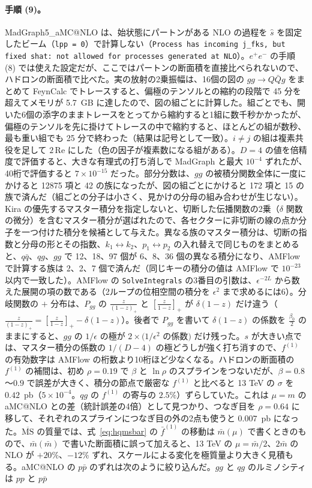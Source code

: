 \documentclass[a4paper,10pt]{ltjsarticle}
\newcommand{\MSbar}{\overline{\mathrm{MS}}}
\begin{document}
\paragraph{手順 (9)。}MadGraph5\_aMC@NLO は、始状態にパートンがある NLO の過程を $\hat s$ を固定したビーム（\texttt{lpp = 0}）で計算しない（\texttt{Process has incoming j\_fks, but fixed shat: not allowed for processes generated at NLO}）。$e^+e^-$ の手順 (8) では使えた設定だが、ここではパートンの断面積を直接比べられないので、ハドロンの断面積で比べた。実の放射の2乗振幅は、16個の図の $gg\to Q\bar Qg$ をまとめて FeynCalc でトレースすると、偏極のテンソルとの縮約の段階で 45 分を超えてメモリが 5.7~GB に達したので、図の組ごとに計算した。組ごとでも、開いた6個の添字のままトレースをとってから縮約すると1組に数千秒かかったが、偏極のテンソルを先に掛けてトレースの中で縮約すると、ほとんどの組が数秒、最も重い組でも 25 分で終わった（結果は記号として一致）。$i\ne j$ の組は複素共役を足して $2\,\mathrm{Re}$ にした（色の因子が複素数になる組がある）。$D=4$ の値を倍精度で評価すると、大きな有理式の打ち消しで MadGraph と最大 $10^{-4}$ ずれたが、40桁で評価すると $7\times10^{-15}$ だった。部分分数は、$gg$ の被積分関数全体に一度にかけると 12875 項と 42 の族になったが、図の組ごとにかけると 172 項と 15 の族で済んだ（組ごとの分子は小さく、見かけの分母の組み合わせが生じない）。Kira の優先するマスター積分を指定しないと、切断した伝播関数の2乗（$\delta$ 関数の微分）を含むマスター積分が選ばれたので、各セクターに非切断の線の点か分子を一つ付けた積分を候補として与えた。異なる族のマスター積分は、切断の指数と分母の形とその指数、$k_1\leftrightarrow k_2$、$p_1\leftrightarrow p_2$ の入れ替えで同じものをまとめると、$q\bar q$、$qg$、$gg$ で 12、18、97 個が 6、8、36 個の異なる積分になり、AMFlow で計算する族は 2、2、7 個で済んだ（同じキーの積分の値は AMFlow で $10^{-23}$ 以内で一致した）。AMFlow の \texttt{SolveIntegrals} の3番目の引数は、$\epsilon^{-2L}$ から数えた展開の項の数である（2ループの位相空間の積分を $\epsilon^2$ まで求めるには6）。分岐関数の $+$ 分布は、$P_{gg}$ の $\frac z{(1-z)_+}$ と $[\frac z{1-z}]_+$ が $\delta(1-z)$ だけ違う（$\frac z{(1-z)_+}=[\frac z{1-z}]_+-\delta(1-z)$）。後者で $P_{gg}$ を書いて $\delta(1-z)$ の係数を $\frac{\beta_0}2$ のままにすると、$gg$ の $1/\epsilon$ の極が $2\times(1/\epsilon^2$ の係数$)$ だけ残った。$s$ が大きい点では、マスター積分の係数の $1/(D-4)$ の極どうしが強く打ち消すので、$f^{(1)}$ の有効数字は AMFlow の桁数より10桁ほど少なくなる。ハドロンの断面積の $f^{(1)}$ の補間は、初め $\rho=0.19$ で $\beta$ と $\ln\rho$ のスプラインをつないだが、$\beta=0.8$〜$0.9$ で誤差が大きく、積分の節点で厳密な $f^{(1)}$ と比べると 13 TeV の $\sigma$ を $0.42$~pb（$5\times10^{-4}$。$qg$ の $f^{(1)}$ の寄与の $2.5\%$）ずらしていた。これは $\mu=m$ の aMC@NLO との差（統計誤差の4倍）として見つかり、つなぎ目を $\rho=0.64$ に移して、それぞれのスプラインにつなぎ目の外の2点も使うと $0.007$~pb になった。$\MSbar$ の質量では、式~\eqref{eq:hqmsbar} の $\bar f^{(1)}$ の移動は $\bar m(\mu)$ で書くときのもので、$\bar m(\bar m)$ で書いた断面積に誤って加えると、13 TeV の $\mu=\bar m/2$、$2\bar m$ の NLO が $+20\%$、$-12\%$ ずれ、スケールによる変化を極質量より大きく見積もる。aMC@NLO の $p\bar p$ のずれは次のように絞り込んだ。$gg$ と $qg$ のルミノシティは $pp$ と $p\bar p$ 
\end{document}
